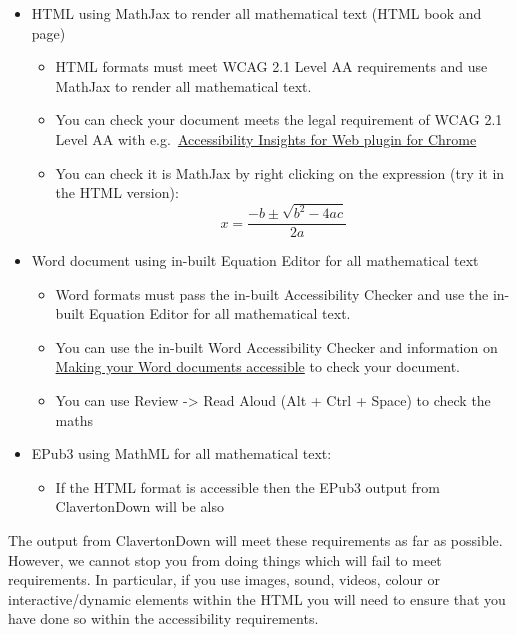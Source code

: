 \documentclass[
  10pt,
  a4paper]{article}
\providecommand{\tightlist}{%
  \setlength{\itemsep}{0pt}\setlength{\parskip}{0pt}}
\theoremstyle{plain}
\theoremstyle{definition}
\theoremstyle{plain}
\theoremstyle{plain}
\theoremstyle{plain}
\theoremstyle{plain}
\theoremstyle{definition}
\theoremstyle{definition}
\theoremstyle{remark}
\theoremstyle{remark}
\begin{document}
\begin{itemize}
\tightlist
\item
  HTML using MathJax to render all mathematical text (HTML book and page)

  \begin{itemize}
  \tightlist
  \item
    HTML formats must meet WCAG 2.1 Level AA requirements and use MathJax to render all mathematical text.
  \item
    You can check your document meets the legal requirement of WCAG 2.1 Level AA with e.g.~\href{https://accessibilityinsights.io/docs/en/web/overview}{Accessibility Insights for Web plugin for Chrome}
  \item
    You can check it is MathJax by right clicking on the expression (try it in the HTML version):
    \[x = \frac{-b\pm\sqrt{b^2 - 4ac}}{2a}\]
  \end{itemize}
\item
  Word document using in-built Equation Editor for all mathematical text

  \begin{itemize}
  \tightlist
  \item
    Word formats must pass the in-built Accessibility Checker and use the in-built Equation Editor for all mathematical text.
  \item
    You can use the in-built Word Accessibility Checker and information on \href{https://support.office.com/en-gb/article/make-your-word-documents-accessible-to-people-with-disabilities-d9bf3683-87ac-47ea-b91a-78dcacb3c66d}{Making your Word documents accessible} to check your document.
  \item
    You can use Review -\textgreater{} Read Aloud (Alt + Ctrl + Space) to check the maths
  \end{itemize}
\item
  EPub3 using MathML for all mathematical text:

  \begin{itemize}
  \tightlist
  \item
    If the HTML format is accessible then the EPub3 output from ClavertonDown will be also
  \end{itemize}
\end{itemize}

The output from ClavertonDown will meet these requirements as far as possible. However, we cannot stop you from doing things which will fail to meet requirements. In particular, if you use images, sound, videos, colour or interactive/dynamic elements within the HTML you will need to ensure that you have done so within the accessibility requirements.
\end{document}
